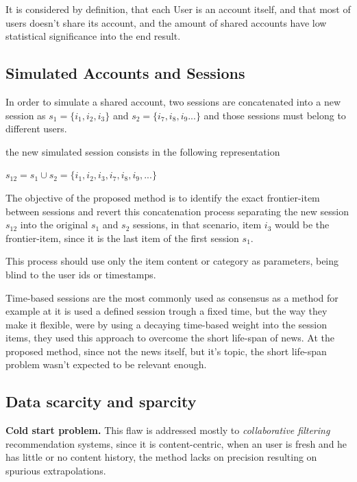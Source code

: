 \documentclass[ecp,tc,english]{iiufrgs}
\begin{document}
    It is considered by definition, that each User is an account itself, and that most of users doesn't share its account, and the amount of shared accounts have low  statistical significance into the end result.
    
        \subsection{Simulated Accounts and Sessions}
        In order to simulate a shared account, two sessions are concatenated into a new session as \(s_{1} = \{i_{1}, i_{2}, i_{3}\}\) and  \(s_{2} = \{i_{7}, i_{8}, i_{9} ...\}\) and those sessions must belong to different users.
    
        the new simulated session consists in the following representation
    
        \(s_{12} =  s_{1} \cup  s_{2} =  \{i_{1}, i_{2}, i_{3}, i_{7}, i_{8}, i_{9}, ...\}\)
    
        The objective of the proposed method is to identify the exact frontier-item between sessions and revert this concatenation process separating the new session  \(s_{12}\) into the original \(s_{1}\) and \(s_{2}\) sessions, in that scenario, item \(i_{3}\) would be the frontier-item, since it is the last item of the first session \(s_{1}\).
    
        This process should use only the item content or category as parameters, being blind to the user ids or timestamps.
        
        Time-based sessions are the most commonly used as consensus as a method for example at \cite{sottocornola2018} it is used a defined session trough a fixed time, but the way they make it flexible, were by using a decaying time-based weight into the session items, they used this approach to overcome the short life-span of news. At the proposed method, since not the news itself, but it's topic, the short life-span problem wasn't expected to be relevant enough.
    
        \subsection{Data scarcity and sparcity} \label{data_scarcity_and_sparcity}
        \textbf{Cold start problem.} This flaw is addressed mostly to \textit{collaborative filtering} recommendation systems, since it is content-centric, when an user is fresh and he has little or no content history, the method lacks on precision resulting on spurious extrapolations.
    
\end{document}
